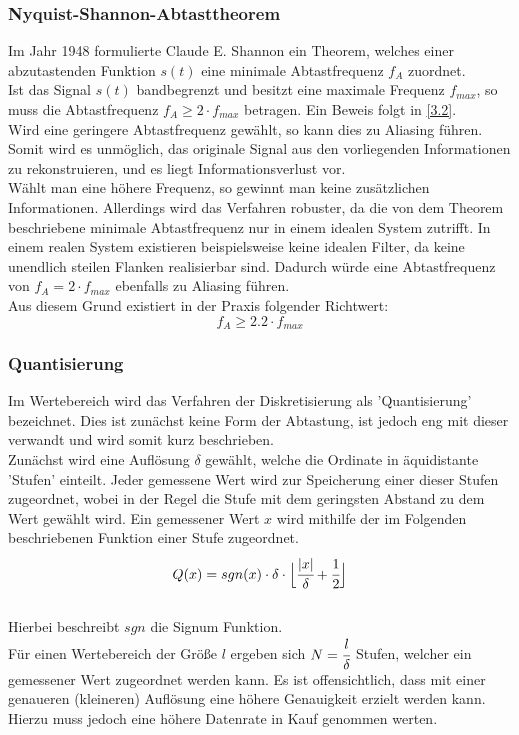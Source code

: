\subsubsection{Nyquist-Shannon-Abtasttheorem}
Im Jahr 1948 formulierte Claude E. Shannon ein Theorem, welches einer abzutastenden Funktion $s(t)$ eine minimale Abtastfrequenz $f_A$ zuordnet.\\
Ist das Signal $s(t)$ bandbegrenzt und besitzt eine maximale Frequenz $f_{max}$, so muss die Abtastfrequenz $f_A \geq 2 \cdot f_{max}$ betragen. Ein Beweis folgt in \ref{3.2}.\\
Wird eine geringere Abtastfrequenz gewählt, so kann dies zu Aliasing führen. Somit wird es unmöglich, das originale Signal aus den vorliegenden Informationen zu rekonstruieren, und es liegt Informationsverlust vor.\\
Wählt man eine höhere Frequenz, so gewinnt man keine zusätzlichen Informationen. Allerdings wird das Verfahren robuster, da die von dem Theorem beschriebene minimale Abtastfrequenz nur in einem idealen System zutrifft. In einem realen System existieren beispielsweise keine idealen Filter, da keine unendlich steilen Flanken realisierbar sind. Dadurch würde eine Abtastfrequenz von $f_A = 2 \cdot f_{max}$ ebenfalls zu Aliasing führen.\\
Aus diesem Grund existiert in der Praxis folgender Richtwert:\\
$$f_A \geq 2.2 \cdot f_{max}$$


\subsubsection{Quantisierung}
Im Wertebereich wird das Verfahren der Diskretisierung als 'Quantisierung' bezeichnet. Dies ist zunächst keine Form der Abtastung, ist jedoch eng mit dieser verwandt und wird somit kurz beschrieben.\\

Zunächst wird eine Auflösung $\delta$ gewählt, welche die Ordinate in äquidistante 'Stufen' einteilt. Jeder gemessene Wert wird zur Speicherung einer dieser Stufen zugeordnet, wobei in der Regel die Stufe mit dem geringsten Abstand zu dem Wert gewählt wird. Ein gemessener Wert $x$ wird mithilfe der im Folgenden beschriebenen Funktion einer Stufe zugeordnet.\\
$$Q(x) = sgn(x) \cdot \delta \cdot \Big\lfloor \cfrac{|x|}{\delta} + \cfrac{1}{2} \Big\rfloor $$\\
Hierbei beschreibt $sgn$ die Signum Funktion.\\
Für einen Wertebereich der Größe $l$ ergeben sich $N = \cfrac{l}{\delta}$ Stufen, welcher ein gemessener Wert zugeordnet werden kann. Es ist offensichtlich, dass mit einer genaueren (kleineren) Auflösung eine höhere Genauigkeit erzielt werden kann. Hierzu muss jedoch eine höhere Datenrate in Kauf genommen werten.


